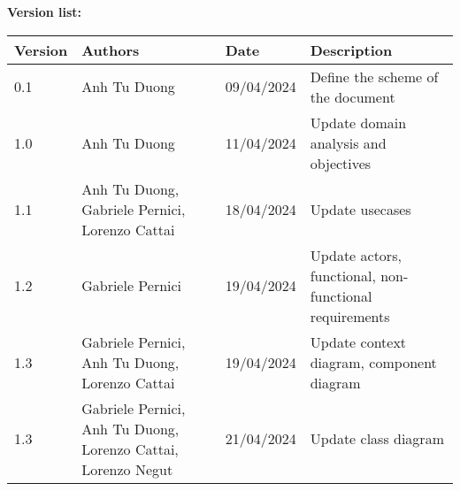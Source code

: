 \textcolor{RFIGreen}{\Large\bf Version list:}


\begin{center}

{\setlength{\extrarowheight}{6pt}
\begin{tabular}{|p{1.5cm}|p{4.5cm}|p{2.5cm}|p{5.5cm}|}
\hline
{\small\bf Version} & {\small\bf Authors} & {\small\bf Date} & {\small\bf Description}\\
\hline
0.1 & Anh Tu Duong & 09/04/2024  & Define the scheme of the document \\
\hline
1.0 & Anh Tu Duong & 11/04/2024  & Update domain analysis and objectives \\
\hline
1.1 & Anh Tu Duong, Gabriele Pernici, Lorenzo Cattai & 18/04/2024  & Update usecases \\
\hline
1.2 & Gabriele Pernici & 19/04/2024  & Update actors, functional, non-functional requirements \\
\hline
1.3 & Gabriele Pernici, Anh Tu Duong, Lorenzo Cattai & 19/04/2024  & Update context diagram, component diagram \\
\hline
1.3 & Gabriele Pernici, Anh Tu Duong, Lorenzo Cattai, Lorenzo Negut & 21/04/2024  & Update class diagram \\
\end{tabular}
}

\end{center}

\newpage
